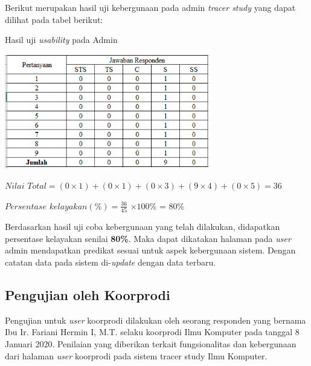 \begin{enumerate}
	Berikut merupakan hasil uji kebergunaan pada admin \textit{tracer study} yang dapat dilihat pada tabel berikut:
	
	\begin{table}[H]
		\centering
		\caption{Hasil uji \textit{usability} pada Admin}
		\includegraphics[width=9cm,height=5cm]{gambar/UAT/hasil_u_admin}
		\label{h_u_admin}
	\end{table}
	
	$Nilai$ $Total = (0 \times 1) + (0 \times 1) + (0 \times 3) + (9 \times 4) + (0 \times 5) = 36$
	
	$Persentase$ $kelayakan (\%) = \frac{36}{45} $ $\times 100\%$ = 80\%
	
	Berdasarkan hasil uji coba kebergunaan yang telah dilakukan, didapatkan persentase kelayakan senilai \textbf{80\%}. Maka dapat dikatakan halaman pada \textit{user} admin mendapatkan predikat sesuai untuk aspek kebergunaan sistem. Dengan catatan data pada sistem di-\textit{update} dengan data terbaru.
	
\end{enumerate}

\subsection{Pengujian oleh Koorprodi}
Pengujian untuk \textit{user} koorprodi dilakukan oleh seorang responden yang bernama Ibu Ir. Fariani Hermin I, M.T. selaku koorprodi Ilmu Komputer pada tanggal 8 Januari 2020. Penilaian yang diberikan terkait fungsionalitas dan kebergunaan dari halaman \textit{user} koorprodi pada sistem tracer study Ilmu Komputer.

